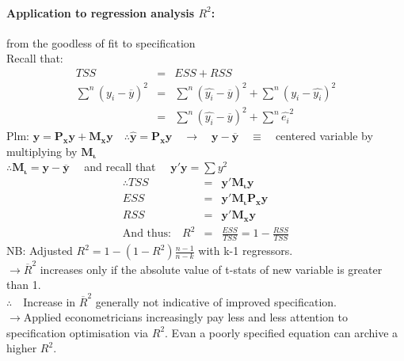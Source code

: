 \paragraph{Application to regression analysis $R^2$:} from the goodless of fit to specification\\
Recall that:
\begin{eqnarray*}
TSS &=& ESS+RSS\\
\sum^{n}(y_{i}-\overline{y})^{2} &=& \sum^{n}(\hat{y_{i}}-\overline{y})^{2}+\sum^{n}(y_{i}-\hat{y_{i}})^{2}\\
 &=& \sum^{n}(\hat{y_{i}}-\overline{y})^{2}+\sum^{n}\hat{e_{i}}^{2}
\end{eqnarray*}
Plm: $\boldsymbol{y} = \boldsymbol{P_{x}y} + \boldsymbol{M_{x}y}\quad\therefore \boldsymbol{\hat{y}}=\boldsymbol{P_{x}y}\quad\to\quad \boldsymbol{y}-\overline{\boldsymbol{y}}\quad\equiv\quad$centered variable by multiplying by $\boldsymbol{M_{\iota}}$\\
$\therefore\boldsymbol{M_{\iota}}=\boldsymbol{y}-\overline{\boldsymbol{y}}\quad$ and recall that $\quad\boldsymbol{y'y}=\sum y^{2}$
\begin{eqnarray*}
\therefore TSS &=& \boldsymbol{y'M_{\iota}y}\\
ESS &=& \boldsymbol{y'M_{\iota}P_{x}y}\\
RSS &=& \boldsymbol{y'M_{x}y}\\
\text{And thus:}\quad R^{2} &=& \frac{ESS}{TSS}=1-\frac{RSS}{TSS}
\end{eqnarray*}
NB: Adjusted $R^{2}=1-(1-R^{2})\frac{n-1}{n-k}$ with k-1 regressors.\\
$\to\overline{R}^{2}$ increases only if the absolute value of t-stats of new variable is greater than 1.\\
$\therefore\quad$Increase in $\overline{R}^{2}$ generally not indicative of improved specification.\\
$\to$Applied econometricians increasingly pay less and less attention to specification optimisation via $R^{2}$. Evan a poorly specified equation can archive a higher $R^{2}$.


